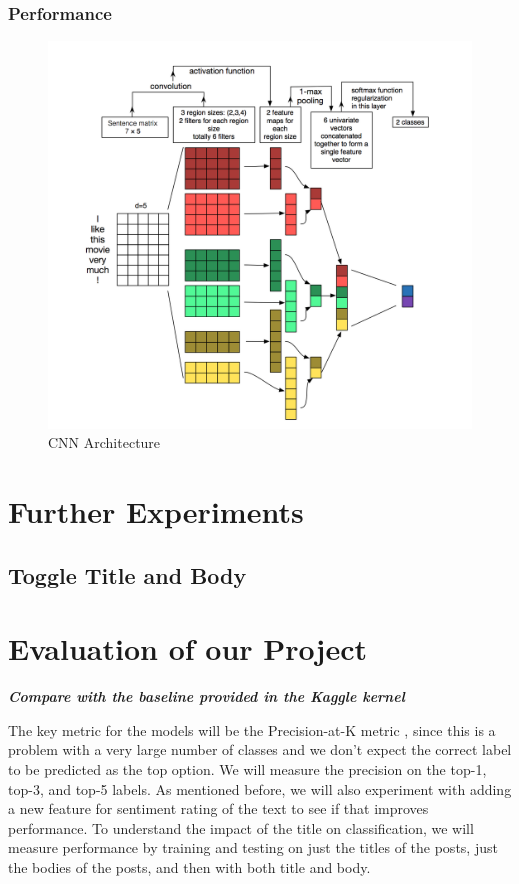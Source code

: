 \documentclass{sig-alternate-05-2015}
\begin{document}
\subsubsection{Performance}
\begin{figure}[H]
\centering
\includegraphics[width=\linewidth]{plots/multi-channel-CNN-architecture.png}
\caption{CNN Architecture}
\end{figure}

\section{Further Experiments}
\subsection{Toggle Title and Body}

\section{Evaluation of our Project}

\textit{\textbf{Compare with the baseline provided in the Kaggle kernel}}

The key metric for the models will be the Precision-at-K metric \cite{krizhevsky2012imagenet}, since this is a problem with a very large number of classes and we don't expect the correct label to be predicted as the top option. We will measure the precision on the top-1, top-3, and top-5 labels. As mentioned before, we will also experiment with adding a new feature for sentiment rating of the text to see if that improves performance. To understand the impact of the title on classification, we will measure performance by training and testing on just the titles of the posts, just the bodies of the posts, and then with both title and body.
\end{document}
